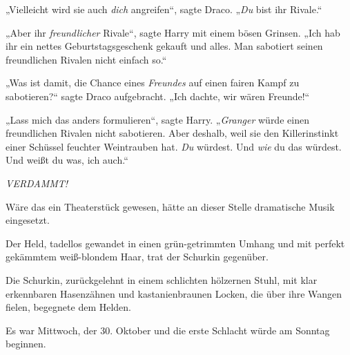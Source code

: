 „Vielleicht wird sie auch \emph{dich} angreifen“, sagte Draco. „\emph{Du} bist ihr Rivale.“

„Aber ihr \emph{freundlicher} Rivale“, sagte Harry mit einem bösen Grinsen. „Ich hab ihr ein nettes Geburtstagsgeschenk gekauft und alles. Man sabotiert seinen freundlichen Rivalen nicht einfach so.“

„Was ist damit, die Chance eines \emph{Freundes} auf einen fairen Kampf zu sabotieren?“ sagte Draco aufgebracht. „Ich dachte, wir wären Freunde!“

„Lass mich das anders formulieren“, sagte Harry. „\emph{Granger} würde einen freundlichen Rivalen nicht sabotieren. Aber deshalb, weil sie den Killerinstinkt einer Schüssel feuchter Weintrauben hat. \emph{Du} würdest. Und \emph{wie} du das würdest. Und weißt du was, ich auch.“

\emph{VERDAMMT!}

\later

Wäre das ein Theaterstück gewesen, hätte an dieser Stelle dramatische Musik eingesetzt.

Der Held, tadellos gewandet in einen grün-getrimmten Umhang und mit perfekt gekämmtem weiß-blondem Haar, trat der Schurkin gegenüber.

Die Schurkin, zurückgelehnt in einem schlichten hölzernen Stuhl, mit klar erkennbaren Hasenzähnen und kastanienbraunen Locken, die über ihre Wangen fielen, begegnete dem Helden.

Es war Mittwoch, der 30. Oktober und die erste Schlacht würde am Sonntag beginnen.

